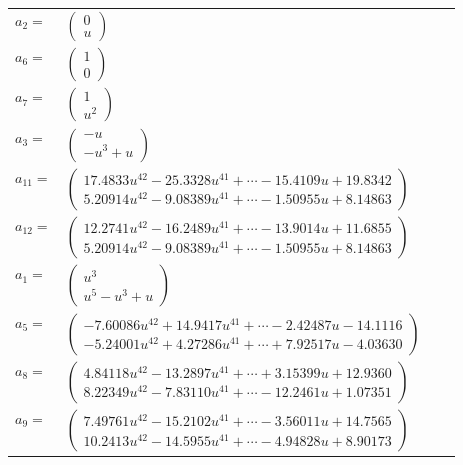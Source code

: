 \documentclass[1p]{elsarticle_modified}
\theoremstyle{definition}
\begin{document}
\begin{tabular}{m{7pt} m{180pt} m{7pt} m{180pt} }
\flushright $a_{2}=$&$\begin{pmatrix}0\\u\end{pmatrix}$ \\
\flushright $a_{6}=$&$\begin{pmatrix}1\\0\end{pmatrix}$ \\
\flushright $a_{7}=$&$\begin{pmatrix}1\\u^2\end{pmatrix}$ \\
\flushright $a_{3}=$&$\begin{pmatrix}- u\\- u^3+u\end{pmatrix}$ \\
\flushright $a_{11}=$&$\begin{pmatrix}17.4833 u^{42}-25.3328 u^{41}+\cdots-15.4109 u+19.8342\\5.20914 u^{42}-9.08389 u^{41}+\cdots-1.50955 u+8.14863\end{pmatrix}$ \\
\flushright $a_{12}=$&$\begin{pmatrix}12.2741 u^{42}-16.2489 u^{41}+\cdots-13.9014 u+11.6855\\5.20914 u^{42}-9.08389 u^{41}+\cdots-1.50955 u+8.14863\end{pmatrix}$ \\
\flushright $a_{1}=$&$\begin{pmatrix}u^3\\u^5- u^3+u\end{pmatrix}$ \\
\flushright $a_{5}=$&$\begin{pmatrix}-7.60086 u^{42}+14.9417 u^{41}+\cdots-2.42487 u-14.1116\\-5.24001 u^{42}+4.27286 u^{41}+\cdots+7.92517 u-4.03630\end{pmatrix}$ \\
\flushright $a_{8}=$&$\begin{pmatrix}4.84118 u^{42}-13.2897 u^{41}+\cdots+3.15399 u+12.9360\\8.22349 u^{42}-7.83110 u^{41}+\cdots-12.2461 u+1.07351\end{pmatrix}$ \\
\flushright $a_{9}=$&$\begin{pmatrix}7.49761 u^{42}-15.2102 u^{41}+\cdots-3.56011 u+14.7565\\10.2413 u^{42}-14.5955 u^{41}+\cdots-4.94828 u+8.90173\end{pmatrix}$ \\

\end{tabular}
\end{document}
